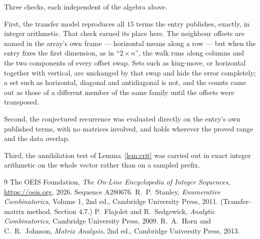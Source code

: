\documentclass[11pt,a4paper]{article}
\theoremstyle{plain}
\theoremstyle{definition}
\begin{document}
Three checks, each independent of the algebra above.

First, the transfer model reproduces all $15$ terms the entry publishes, exactly, in
integer arithmetic. That check earned its place here. The neighbour offsets are named in the
array's own frame --- horizontal means along a row --- but when the entry fixes the first
dimension, as in ``$2\times n$'', the walk runs along columns and the two components of every
offset swap. Sets such as king-move, or horizontal together with vertical, are unchanged by
that swap and hide the error completely; a set such as horizontal, diagonal and antidiagonal
is not, and the counts came out as those of a different member of the same family until the
offsets were transposed.

Second, the conjectured recurrence was evaluated directly on the entry's own published terms,
with no matrices involved, and holds wherever the proved range and the data overlap.

Third, the annihilation test of Lemma~\ref{lem:crit} was carried out in exact integer
arithmetic on the whole vector rather than on a sampled prefix.

\begin{thebibliography}{9}
 The OEIS Foundation, \emph{The On-Line Encyclopedia of Integer
Sequences}, \url{https://oeis.org}, 2026. Sequence A280676.
 R.~P.~Stanley, \emph{Enumerative Combinatorics}, Volume 1, 2nd ed.,
Cambridge University Press, 2011. (Transfer-matrix method, Section 4.7.)
 P.~Flajolet and R.~Sedgewick, \emph{Analytic Combinatorics}, Cambridge
University Press, 2009.
 R.~A.~Horn and C.~R.~Johnson, \emph{Matrix Analysis}, 2nd ed., Cambridge
University Press, 2013.
\end{thebibliography}
\end{document}
